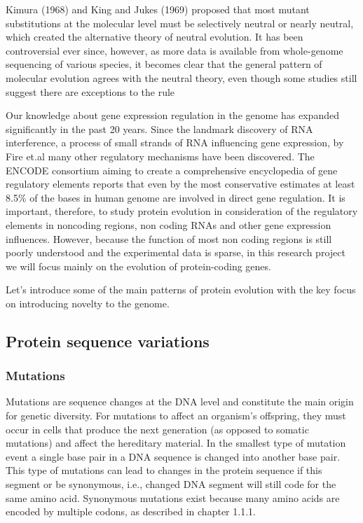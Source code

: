 \documentclass[11pt, a4paper,oneside]{report}
\begin{document}
 Kimura (1968)\cite{Kimura1968} and King and Jukes (1969)\cite{King1969} proposed that most mutant substitutions at the molecular level must be selectively neutral or nearly neutral, which created the alternative theory of neutral evolution. It has been controversial ever since, however, as more data is available from whole-genome sequencing of various species, it becomes clear that the general pattern of molecular evolution agrees with the neutral theory, even though some studies still suggest there are exceptions to the rule\cite{Haygood2007,Nielsen2007,Akey2009}  

Our knowledge about gene expression regulation in the genome has expanded significantly in the past 20 years. Since the landmark discovery of RNA interference, a process of small strands of RNA influencing gene expression, by Fire et.al \cite{Fire1998} many other regulatory mechanisms have been discovered.  The ENCODE consortium aiming to create a comprehensive encyclopedia of gene regulatory elements reports that even by the most conservative estimates at least 8.5\% of the bases in human genome are involved in direct gene regulation\cite{Bernstein2012}.  It is important, therefore, to study protein evolution in consideration of the regulatory elements in noncoding regions, non coding RNAs and other gene expression influences. However, because the function of most non coding regions is still poorly understood and the experimental data is sparse, in this research project we will focus mainly on the evolution of protein-coding genes. 

Let's introduce some of the main patterns of protein evolution with the key focus on introducing novelty to the genome.

\subsection{Protein sequence variations}
\subsubsection{Mutations}
Mutations are sequence changes at the DNA level and constitute the main origin for genetic diversity. For mutations to affect an organism's offspring, they must occur in cells that produce the next generation (as opposed to somatic mutations\cite{britannica}) and affect the hereditary material. In the smallest type of mutation event a single base pair in a DNA sequence is changed into another base pair. This type of mutations can lead to changes in the protein sequence if this segment or be synonymous, i.e., changed DNA segment will still code for the same amino acid. Synonymous mutations exist because many amino acids are encoded by multiple codons, as described in chapter 1.1.1. 
\end{document}
